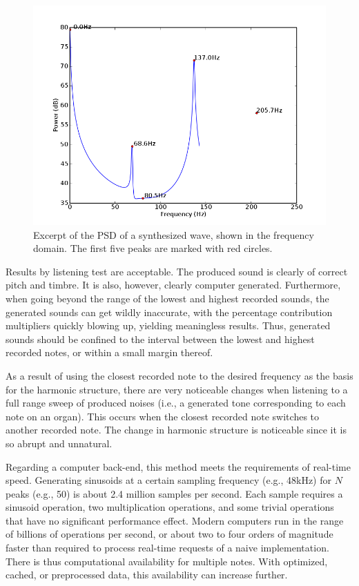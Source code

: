 \documentclass[twocolumn]{article}
\begin{document}
\begin{figure}
\centering
\includegraphics[width=\linewidth]{figures/synth-peaks.png}
\caption{Excerpt of the PSD of a synthesized wave, shown in the frequency domain. The first five peaks are marked with red circles.}
\label{peaks}
\end{figure}

Results by listening test are acceptable. The produced sound is clearly of correct pitch and timbre. It is also, however, clearly computer generated. Furthermore, when going beyond the range of the lowest and highest recorded sounds, the generated sounds can get wildly inaccurate, with the percentage contribution multipliers quickly blowing up, yielding meaningless results. Thus, generated sounds should be confined to the interval between the lowest and highest recorded notes, or within a small margin thereof.

As a result of using the closest recorded note to the desired frequency as the basis for the harmonic structure, there are very noticeable changes when listening to a full range sweep of produced noises (i.e., a generated tone corresponding to each note on an organ). This occurs when the closest recorded note switches to another recorded note. The change in harmonic structure is noticeable since it is so abrupt and unnatural.

Regarding a computer back-end, this method meets the requirements of real-time speed. Generating sinusoids at a certain sampling frequency (e.g., 48kHz) for $N$ peaks (e.g., 50) is about 2.4 million samples per second. Each sample requires a sinusoid operation, two multiplication operations, and some trivial operations that have no significant performance effect. Modern computers run in the range of billions of operations per second, or about two to four orders of magnitude faster than required to process real-time requests of a naive implementation. There is thus computational availability for multiple notes. With optimized, cached, or preprocessed data, this availability can increase further.
\end{document}
